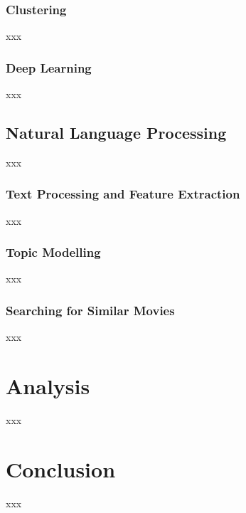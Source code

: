 \documentclass{article}
\begin{document}
\begin{multicols}{2}
\subsubsection{Clustering}

xxx

\subsubsection{Deep Learning}

xxx

\subsection{Natural Language Processing}

xxx

\subsubsection{Text Processing and Feature Extraction}

xxx

\subsubsection{Topic Modelling}

xxx

\subsubsection{Searching for Similar Movies}

xxx

\section{Analysis}

xxx

\section{Conclusion}

xxx

\end{multicols}







\end{document}

